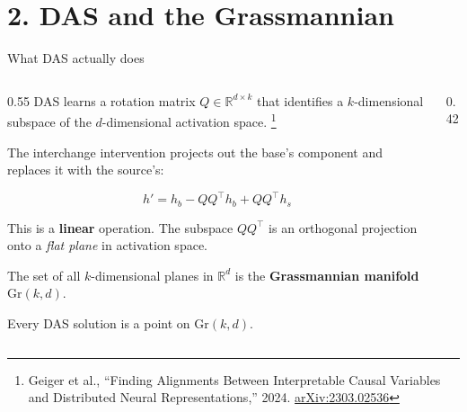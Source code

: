 \documentclass[aspectratio=169,11pt]{beamer}
\newcommand{\Gr}{\mathrm{Gr}}
\newcommand{\R}{\mathbb{R}}
\begin{document}
\hypertarget{sec2}{}
\section{2. DAS and the Grassmannian}

\begin{frame}{What DAS actually does}

\begin{columns}[T]
\begin{column}{0.55\textwidth}
{\small DAS learns a rotation matrix $Q \in \R^{d \times k}$ that identifies a $k$-dimensional subspace of the $d$-dimensional activation space.}%
\footnote{\tiny Geiger et al., ``Finding Alignments Between Interpretable Causal Variables and Distributed Neural Representations,'' 2024. \href{https://arxiv.org/abs/2303.02536}{arXiv:2303.02536}}

\vspace{0.3em}
{\small The interchange intervention projects out the base's component and replaces it with the source's:}

$$h' = h_b - QQ^\top h_b + QQ^\top h_s$$

{\small This is a \textbf{linear} operation. The subspace $QQ^\top$ is an orthogonal projection onto a \emph{flat plane} in activation space.}

\vspace{0.3em}
{\small The set of all $k$-dimensional planes in $\R^d$ is the \textbf{Grassmannian manifold} $\Gr(k,d)$.}

\vspace{0.3em}
{\small Every DAS solution is a point on $\Gr(k,d)$.}
\end{column}
\begin{column}{0.42\textwidth}
\end{column}
\end{columns}
\end{frame}
\end{document}

